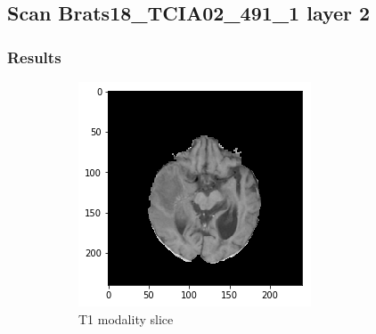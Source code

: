 \subsection{Scan Brats18\_TCIA02\_491\_1 layer 2}
\subsubsection{Results}


\begin{figure}[H]
    \centering
    \begin{subfigure}[t]{.4\textwidth}
        \centering
        \includegraphics[width=\linewidth]{chapters/06_hdm/a_Brats18_TCIA02_491_1_L2/1.png}
        \caption{T1 modality slice}
    \end{subfigure}\hspace{1cm}%
    \begin{subfigure}[t]{.4\textwidth}
        \centering

\end{subfigure}
\end{figure}
